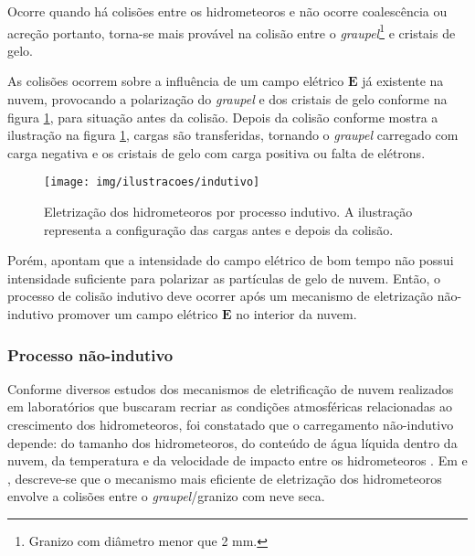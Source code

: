 Ocorre quando há colisões entre os hidrometeoros e não ocorre coalescência ou acreção portanto, torna-se mais provável na colisão entre o \textit{graupel}\footnote{Granizo com diâmetro menor que 2 mm.} e cristais de gelo.

As colisões ocorrem sobre a influência de um campo elétrico $\mathbf{E}$ já existente na nuvem, provocando a polarização do \textit{graupel} e dos cristais de gelo conforme na figura \ref{fig:ind}, para situação antes da colisão. Depois da colisão conforme mostra a ilustração na figura \ref{fig:ind}, cargas são transferidas, tornando o \textit{graupel} carregado com carga negativa e os cristais de gelo com carga positiva ou falta de elétrons.

\begin{figure}[ht]
   \centering
   \texttt{[image: img/ilustracoes/indutivo]}
   \caption{Eletrização dos hidrometeoros por processo indutivo. A ilustração representa a configuração das cargas antes e depois da colisão.}
   \label{fig:ind}
\end{figure}

Porém,  apontam que a intensidade do campo elétrico de bom tempo não possui intensidade suficiente para polarizar as partículas de gelo de nuvem. Então, o processo de colisão indutivo deve ocorrer após um mecanismo de eletrização não-indutivo promover um campo elétrico $\mathbf{E}$ no interior da nuvem. 

\subsubsection{Processo não-indutivo}

Conforme diversos estudos dos mecanismos de eletrificação de nuvem realizados em laboratórios que buscaram recriar as condições atmosféricas relacionadas ao crescimento dos hidrometeoros, foi constatado que o carregamento não-indutivo depende: do tamanho dos hidrometeoros, do conteúdo de água líquida dentro da nuvem, da temperatura e da velocidade de impacto entre os hidrometeoros  \cite{reynolds1957, Takahashi1978, baker1994, Saunders1999, pereyra2000}. Em  e , descreve-se que o mecanismo mais eficiente de eletrização dos hidrometeoros envolve a colisões entre o \textit{graupel}/granizo com neve seca. 

